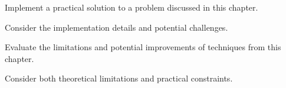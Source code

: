 \begin{exercisebox}[hard]
\begin{problem}
Implement a practical solution to a problem discussed in this chapter.
\end{problem}
\begin{hintbox}
Consider the implementation details and potential challenges.
\end{hintbox}
\end{exercisebox}


\begin{exercisebox}[hard]
\begin{problem}
Evaluate the limitations and potential improvements of techniques from this chapter.
\end{problem}
\begin{hintbox}
Consider both theoretical limitations and practical constraints.
\end{hintbox}
\end{exercisebox}

